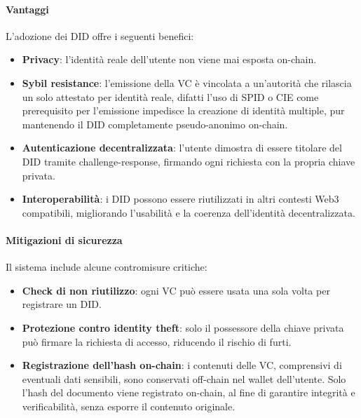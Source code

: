                 \paragraph{Vantaggi}
                    L'adozione dei DID offre i seguenti benefici:
                        \begin{itemize}
                            \item \textbf{Privacy}: l'identità reale dell'utente non viene mai esposta on-chain.
                            
                            \item \textbf{Sybil resistance}: l'emissione della VC è vincolata a un'autorità che rilascia un solo attestato per identità reale, difatti l'uso di SPID o CIE come prerequisito per l'emissione impedisce la creazione di identità multiple, pur mantenendo il DID completamente pseudo-anonimo on-chain.
                            
                            \item \textbf{Autenticazione decentralizzata}: l'utente dimostra di essere titolare del DID tramite challenge-response, firmando ogni richiesta con la propria chiave privata.
                            
                            \item \textbf{Interoperabilità}: i DID possono essere riutilizzati in altri contesti Web3 compatibili, migliorando l'usabilità e la coerenza dell'identità decentralizzata.
                        \end{itemize}
                
                \paragraph{Mitigazioni di sicurezza}
                    Il sistema include alcune contromisure critiche:
                        \begin{itemize}
                            \item \textbf{Check di non riutilizzo}: ogni VC può essere usata una sola volta per registrare un DID.
                            
                            \item \textbf{Protezione contro identity theft}: solo il possessore della chiave privata può firmare la richiesta di accesso, riducendo il rischio di furti.
                            
                            \item \textbf{Registrazione dell’hash on-chain}: i contenuti delle VC, comprensivi di eventuali dati sensibili, sono conservati off-chain nel wallet dell'utente. Solo l’hash del documento viene registrato on-chain, al fine di garantire integrità e verificabilità, senza esporre il contenuto originale.
                        \end{itemize}
            
